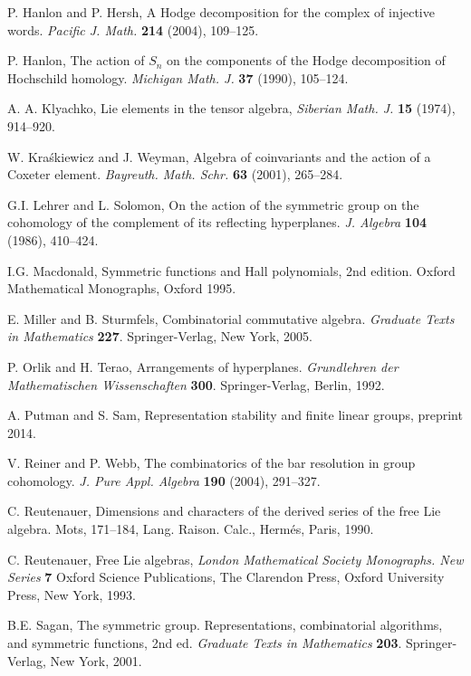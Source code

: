\documentclass[12pt]{amsart}
\theoremstyle{plain}
\theoremstyle{definition}
\begin{document}
\begin{thebibliography}{99}
 P. Hanlon and P. Hersh, 
A Hodge decomposition for the complex of injective words. 
{\it Pacific J. Math.} {\bf 214} (2004), 109--125.

P. Hanlon,
The action of $S_n$ 
on the components of the Hodge decomposition of Hochschild homology.
{\it Michigan Math. J.}  {\bf 37} (1990), 105--124. 

 

A. A. Klyachko, 
Lie elements in the tensor algebra,
{\it Siberian Math. J.} {\bf 15} (1974), 914--920. 

W. Kra\'skiewicz and J. Weyman, 
Algebra of coinvariants and the action of a Coxeter element. 
{\it Bayreuth. Math. Schr.} {\bf 63} (2001), 265--284. 

G.I. Lehrer and L. Solomon, 
On the action of the symmetric group on the cohomology 
of the complement of its reflecting hyperplanes.
{\it J. Algebra} {\bf 104} (1986), 410--424. 

I.G. Macdonald, Symmetric functions and Hall polynomials,
2nd edition. Oxford Mathematical Monographs, Oxford 1995.

E. Miller and B. Sturmfels, 
Combinatorial commutative algebra.
{\it Graduate Texts in Mathematics} {\bf 227}. 
Springer-Verlag, New York, 2005. 

P. Orlik and H. Terao, 
Arrangements of hyperplanes.
{\it Grundlehren der Mathematischen Wissenschaften}
{\bf 300}. Springer-Verlag, Berlin, 1992. 

A. Putman and S. Sam,
Representation stability and finite linear groups,
preprint 2014.

V. Reiner and P. Webb,
The combinatorics of the bar resolution in group cohomology. 
{\it J. Pure Appl. Algebra} {\bf 190} (2004), 291--327. 

C. Reutenauer, 
Dimensions and characters of the derived series of the free Lie algebra. 
Mots, 171--184, Lang. Raison. Calc., Herm\'es, Paris, 1990.

C. Reutenauer, Free Lie algebras, 
{\it London Mathematical Society Monographs.  New Series} 
{\bf 7} Oxford Science Publications, 
The Clarendon Press, Oxford University Press, New York, 1993.

B.E. Sagan,
The symmetric group.
Representations, combinatorial algorithms, and symmetric functions, 2nd ed. 
{\it Graduate Texts in Mathematics}  {\bf 203}. 
Springer-Verlag, New York, 2001. 


\end{thebibliography}
\end{document}
